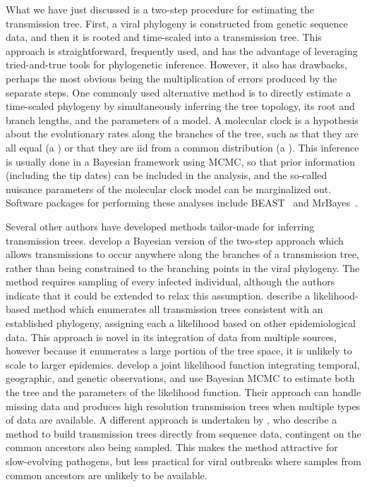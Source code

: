 What we have just discussed is a two-step procedure for estimating the
transmission tree. First, a viral phylogeny is constructed from genetic
sequence data, and then it is rooted and time-scaled into a transmission tree.
This approach is straightforward, frequently used, and has the advantage of
leveraging tried-and-true tools for phylogenetic inference. However, it also
has drawbacks, perhaps the most obvious being the multiplication of errors
produced by the separate steps. One commonly used alternative method is to
directly estimate a time-scaled phylogeny by simultaneously inferring the tree
topology, its root and branch lengths, and the parameters of a  model. A molecular clock is a hypothesis about the evolutionary rates
along the branches of the tree, such as that they are all equal (a ) or that they are \gls{iid} from a common distribution (a ). This inference is usually done in a Bayesian framework using
\gls{MCMC}, so that prior information (including the tip dates) can be included
in the analysis, and the so-called nuisance parameters of the molecular clock
model can be marginalized out. Software packages for performing these analyses
include BEAST~\autocite{bouckaert2014beast} and
MrBayes~\autocite{ronquist2012mrbayes}.

Several other authors have developed methods tailor-made for inferring
transmission trees. \textcite{didelot2014bayesian} develop a Bayesian version
of the two-step approach which allows transmissions to occur anywhere along the
branches of a transmission tree, rather than being constrained to the branching
points in the viral phylogeny. The method requires sampling of every infected
individual, although the authors indicate that it could be extended to relax
this assumption. \textcite{cottam2008integrating} describe a likelihood-based
method which enumerates all transmission trees consistent with an established
phylogeny, assigning each a likelihood based on other epidemiological data. 
This approach is novel in its integration of data from multiple sources,
however because it enumerates a large portion of the tree space, it is unlikely
to scale to larger epidemics. \textcite{ypma2012unravelling} develop a joint 
likelihood function integrating temporal, geographic, and genetic observations, 
and use Bayesian \gls{MCMC} to estimate both the tree and the parameters of the
likelihood function. Their approach can handle missing data and produces high
resolution transmission trees when multiple types of data are available. A
different approach is undertaken by \textcite{jombart2011reconstructing}, who
describe a method to build transmission trees directly from sequence data,
contingent on the common ancestors also being sampled. This makes the method
attractive for slow-evolving pathogens, but less practical for viral outbreaks
where samples from common ancestors are unlikely to be available.

